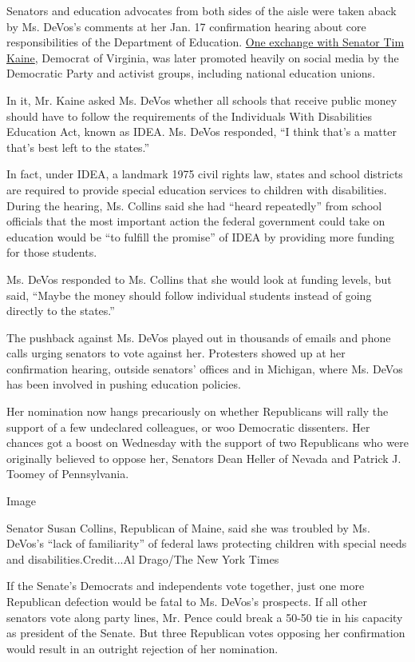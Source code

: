 Senators and education advocates from both sides of the aisle were taken
aback by Ms. DeVos's comments at her Jan. 17 confirmation hearing about
core responsibilities of the Department of Education.
\href{https://www.washingtonpost.com/video/national/tim-kaine-to-betsy-devos-do-you-not-want-to-answer-my-question/2017/01/17/e21d8192-dd1c-11e6-8902-610fe486791c_video.html}{One
exchange with Senator Tim Kaine}, Democrat of Virginia, was later
promoted heavily on social media by the Democratic Party and activist
groups, including national education unions.

In it, Mr. Kaine asked Ms. DeVos whether all schools that receive public
money should have to follow the requirements of the Individuals With
Disabilities Education Act, known as IDEA. Ms. DeVos responded, ``I
think that's a matter that's best left to the states.''

In fact, under IDEA, a landmark 1975 civil rights law, states and school
districts are required to provide special education services to children
with disabilities. During the hearing, Ms. Collins said she had ``heard
repeatedly'' from school officials that the most important action the
federal government could take on education would be ``to fulfill the
promise'' of IDEA by providing more funding for those students.

Ms. DeVos responded to Ms. Collins that she would look at funding
levels, but said, ``Maybe the money should follow individual students
instead of going directly to the states.''

The pushback against Ms. DeVos played out in thousands of emails and
phone calls urging senators to vote against her. Protesters showed up at
her confirmation hearing, outside senators' offices and in Michigan,
where Ms. DeVos has been involved in pushing education policies.

Her nomination now hangs precariously on whether Republicans will rally
the support of a few undeclared colleagues, or woo Democratic
dissenters. Her chances got a boost on Wednesday with the support of two
Republicans who were originally believed to oppose her, Senators Dean
Heller of Nevada and Patrick J. Toomey of Pennsylvania.

Image

Senator Susan Collins, Republican of Maine, said she was troubled by Ms.
DeVos's ``lack of familiarity'' of federal laws protecting children with
special needs and disabilities.Credit...Al Drago/The New York Times

If the Senate's Democrats and independents vote together, just one more
Republican defection would be fatal to Ms. DeVos's prospects. If all
other senators vote along party lines, Mr. Pence could break a 50-50 tie
in his capacity as president of the Senate. But three Republican votes
opposing her confirmation would result in an outright rejection of her
nomination.

